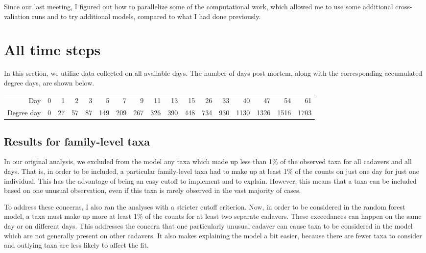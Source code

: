 \documentclass{article}
\begin{document}
Since our last meeting, I figured out how to parallelize some of the
computational work, which allowed me to use some additional
cross-valiation runs and to try additional models, compared to what I
had done previously.



\section{All time steps}

In this section, we utilize data collected on all available days.  The
number of days post mortem, along with the corresponding accumulated
degree days, are shown below.

\begin{center}
\begin{tabular}{r|rrrrrrrrrrrrrrrr}
  Day & 0 & 1 & 2 & 3 & 5 & 7 & 9 & 11 & 13 & 15 & 26 & 33 & 40 & 47 & 54 & 61\\
  Degree day & 0 & 27 & 57 & 87 & 149 & 209 & 267 & 326 & 390 & 448 & 734 & 930 & 1130 & 1326 & 1516 & 1703
\end{tabular}
\end{center}



\subsection{Results for family-level taxa}

In our original analysis, we excluded from the model any taxa which
made up less than 1\% of the observed taxa for all cadavers and all
days.  That is, in order to be included, a particular family-level
taxa had to make up at least 1\% of the counts on just one day for
just one individual.  This has the advantage of being an easy cutoff
to implement and to explain.  However, this means that a taxa can be
included based on one unusual observation, even if this taxa is rarely
observed in the vast majority of cases.

To address these concerns, I also ran the analyses with a stricter
cutoff criterion.  Now, in order to be considered in the random forest
model, a taxa must make up more at least 1\% of the counts for at
least two separate cadavers.  These exceedances can happen on the same
day or on different days.  This addresses the concern that one
particularly unusual cadaver can cause taxa to be considered in the
model which are not generally present on other cadavers.  It also
makes explaining the model a bit easier, because there are fewer taxa
to consider and outlying taxa are less likely to affect the fit.
\end{document}
